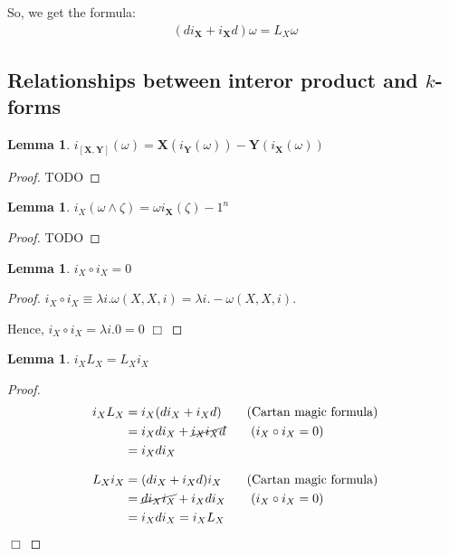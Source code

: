 \documentclass[11pt]{book}
\newcommand{\boldX}{\ensuremath{\mathbf{X}}}
\newcommand{\boldY}{\ensuremath{\mathbf{Y}}}
\def\qed{$\Box$}
\newtheorem{lemma}[theorem]{Lemma}
\newtheorem{proof}[theorem]{Proof}
\begin{document}
So, we get the formula:
\begin{align*}
 (d i_{\mathbf X} + i_{\mathbf X} d) \omega = L_X \omega
\end{align*}

\subsection{Relationships between interor product and $k$-forms}
\begin{lemma}
$i_{[\mathbf X, \mathbf Y]}(\omega) = \boldX(i_\boldY (\omega)) - \boldY(i_\boldX (\omega))$
\end{lemma}
\begin{proof} TODO \end{proof}

\begin{lemma}
$i_{X}(\omega \wedge \zeta ) = \omega i_\boldX (\zeta) - 1^n$
\end{lemma}
\begin{proof} TODO \end{proof}

\begin{lemma}
$i_X \circ i_X = 0$
\end{lemma}
\begin{proof} 
    $i_X \circ i_X \equiv \lambda i. \omega(X, X, i) = \lambda i . - \omega (X, X, i)$.

    Hence, $i_X \circ i_X = \lambda i . 0 = 0$
    \qed
\end{proof}


\begin{lemma}
$i_{X} L_X = L_X i_X$
\end{lemma}
\begin{proof} 
    \begin{align*}
        i_X L_X
        &= i_X (d i_X + i_X d) \qquad \text{(Cartan magic formula)} \\
        &= i_X d i_X + \cancel{i_X i_X d} \qquad \text{($i_X \circ i_X = 0$)} \\
        &= i_X d i_X
    \end{align*}

    \begin{align*}
        L_X i_X
        &= (d i_X + i_X d) i_X \qquad \text{(Cartan magic formula)} \\
        &= \cancel{d i_X i_X} + i_X d i_X \qquad \text{($i_X \circ i_X = 0$)} \\
        &= i_X d i_X
        = i_X L_X
    \end{align*} \qed
\end{proof}
\end{document}
